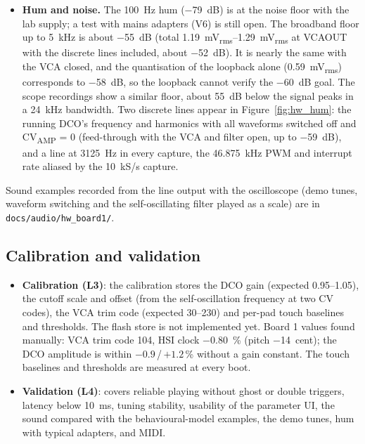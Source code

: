 \documentclass[11pt,a4paper]{article}
\newcommand{\file}[1]{\texttt{#1}}
\newcommand{\sub}[1]{\textsubscript{#1}}
\begin{document}
\begin{itemize}
    in \SI{1.5}{ms} and creeps in over another \SIrange{10}{15}{ms}. A linear RC network would settle alike in
    both directions, so the tail is most likely thermal: the VCA transistors warm up when their current jumps
    from zero. One ADC count is \SI{0.9}{\percent} of this step, so the tail is resolved only coarsely. At
    note-on it is a level creep of about 2\,\%.
  \item \textbf{Hum and noise.} The \SI{100}{Hz} hum (\SI{-79}{dB}) is at the noise floor with the lab
    supply; a test with mains adapters (V6) is still open. The broadband floor up to \SI{5}{kHz} is about
    \SI{-55}{dB} (total \SIrange{1.19}{1.29}{mV_{rms}} at VCAOUT with the discrete lines included, about
    \SI{-52}{dB}). It is nearly the same with the VCA closed, and the quantisation of the loopback alone
    (\SI{0.59}{mV_{rms}}) corresponds to \SI{-58}{dB}, so the loopback cannot verify the \SI{-60}{dB} goal.
    The scope recordings show a similar floor, about \SI{55}{dB} below the signal peaks in a \SI{24}{kHz}
    bandwidth. Two discrete lines appear in Figure~\ref{fig:hw_hum}: the running DCO's frequency and harmonics
    with all waveforms switched off and CV\sub{AMP} = 0 (feed-through with the VCA and filter open, up to
    \SI{-59}{dB}), and a line at \SI{3125}{Hz} in
    every capture, the \SI{46.875}{kHz} PWM and interrupt rate aliased by the \SI{10}{kS/s} capture.
\end{itemize}
Sound examples recorded from the line output with the oscilloscope (demo tunes, waveform switching and the
self-oscillating filter played as a scale) are in \file{docs/audio/hw\_board1/}.

\subsection{Calibration and validation}
\begin{itemize}
  \item \textbf{Calibration (L3)}: the calibration stores the DCO gain (expected 0.95--1.05), the cutoff
    scale and offset (from the self-oscillation frequency at two CV codes), the VCA trim code (expected
    30--230) and per-pad touch baselines and thresholds. The flash store is not implemented yet. Board 1
    values found manually: VCA trim code 104, HSI clock \SI{-0.80}{\percent} (pitch \SI{-14}{cent}); the DCO
    amplitude is within $-0.9$\,/\,$+1.2$\,\% without a gain constant. The touch baselines and thresholds are
    measured at every boot.
  \item \textbf{Validation (L4)}: covers reliable playing without ghost or double triggers, latency below
    \SI{10}{ms}, tuning stability, usability of the parameter UI, the sound compared with the
    behavioural-model examples, the demo tunes, hum with typical adapters, and MIDI.
\end{itemize}
\end{document}
